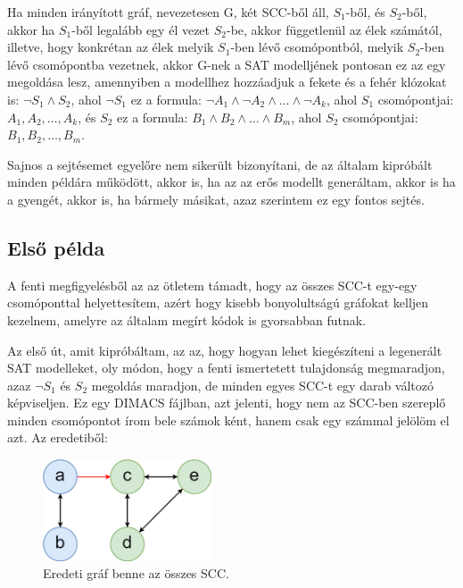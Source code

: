 \documentclass[
]{thesis-ekf}
\theoremstyle{definition}
\theoremstyle{remark}
\begin{document}
	Ha minden irányított gráf, nevezetesen G, két \textsc{SCC}-ből áll, $ S_1 $-ből, és $ S_2 $-ből, akkor ha $ S_1 $-ből legalább egy él vezet $ S_2 $-be, akkor függetlenül az élek számától, illetve, hogy konkrétan az élek melyik $ S_1 $-ben lévő csomópontból, melyik $ S_2 $-ben lévő csomópontba vezetnek, akkor G-nek a \textsc{SAT} modelljének pontosan ez az egy megoldása lesz, amennyiben a modellhez hozzáadjuk a fekete és a fehér klózokat is: $ \neg S_1\wedge S_2 $, ahol $ \neg S_1 $ ez a formula: $\neg A_1 \wedge \neg A_2\wedge\dots\wedge\neg A_k$, ahol $ S_1 $ csomópontjai: $ A_1,A_2,\dots,A_k $, és $ S_2 $ ez a formula: $ B_1\wedge B_2\wedge\dots\wedge B_m $, ahol $ S_2 $ csomópontjai: $ B_1,B_2,\dots,B_m $.
	
	Sajnos a sejtésemet egyelőre nem sikerült bizonyítani, de az általam kipróbált minden példára működött, akkor is, ha az az erős modellt generáltam, akkor is ha a gyengét, akkor is, ha bármely másikat, azaz szerintem ez egy fontos sejtés.
	
		\subsection{Első példa}
	A fenti megfigyelésből az az ötletem támadt, hogy az összes \textsc{SCC}-t egy-egy csomóponttal helyettesítem, azért hogy kisebb bonyolultságú gráfokat kelljen kezelnem, amelyre az általam megírt kódok is gyorsabban futnak.

	Az első út, amit kipróbáltam, az az, hogy hogyan lehet kiegészíteni a legenerált \textsc{SAT} modelleket, oly módon, hogy a fenti ismertetett tulajdonság megmaradjon, azaz $\neg S_1$ és $ S_2 $ megoldás maradjon, de minden egyes \textsc{SCC}-t egy darab változó képviseljen. Ez egy DIMACS fájlban, azt jelenti, hogy nem az \textsc{SCC}-ben szereplő minden csomópontot írom bele számok ként, hanem csak egy számmal jelölöm el azt. Az eredetiből:
	\begin{figure}[h]
		\centering
		\includegraphics[width=5cm]{images/sajat_pelda_5node_9edge}
		\caption{Eredeti gráf benne az összes \textsc{SCC}.}
		\label{abra-sajatpelda-eredeti-5-9graf}
	\end{figure}
		
\end{document}
